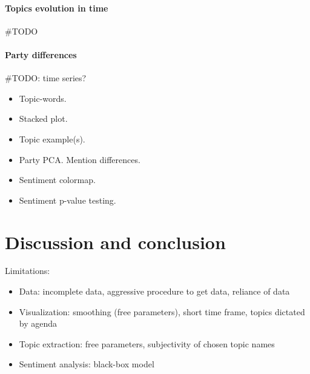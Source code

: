 \documentclass{article}
\begin{document}
\paragraph{Topics evolution in time}
\#TODO

\paragraph{Party differences}
\#TODO: time series?



\begin{itemize}
  \item Topic-words.
  \item Stacked plot.
  \item Topic example(s).
  \item Party PCA. Mention differences.
  \item Sentiment colormap.
  \item Sentiment p-value testing.
\end{itemize}

\section{Discussion and conclusion}
Limitations:
\begin{itemize}
  \item Data: incomplete data, aggressive procedure to get data, reliance of data
  \item Visualization: smoothing (free parameters), short time frame, topics dictated by agenda
  \item Topic extraction: free parameters, subjectivity of chosen topic names
  \item Sentiment analysis: black-box model
\end{itemize}



\end{document}
